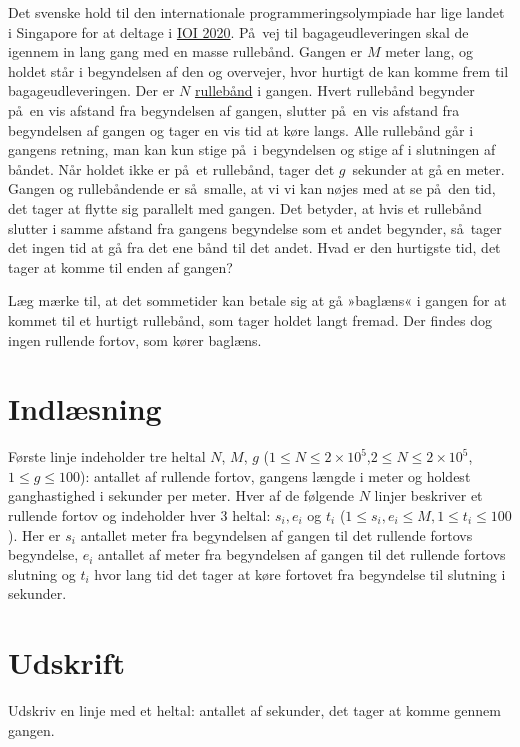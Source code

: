 
Det svenske hold til den internationale programmeringsolympiade har lige landet i Singapore for at deltage i
 \href{https://ioi2020.sg/}{IOI 2020}.
På vej til bagageudleveringen skal de igennem in lang gang med en masse rullebånd.
Gangen er $M$ meter lang, og holdet står i begyndelsen af den og overvejer, hvor hurtigt de kan komme frem til bagageudleveringen. 
Der er $N$ \href{https://sv.wikipedia.org/wiki/Rullande_trottoar}{rullebånd} i gangen.
Hvert rullebånd begynder på en vis afstand fra begyndelsen af gangen, slutter på en vis afstand fra begyndelsen af gangen og tager en vis tid at køre langs.
Alle rullebånd går i gangens retning, man kan kun stige på i begyndelsen og stige af i slutningen af båndet.
Når holdet ikke er på et rullebånd, tager det $g$~sekunder at gå en meter.
Gangen og rullebåndende er så smalle, at vi vi kan nøjes med at se på den tid, det tager at flytte sig parallelt med gangen.
Det betyder, at hvis et rullebånd slutter i samme afstand fra gangens begyndelse som et andet begynder, så tager det ingen tid at gå fra det ene bånd til det andet.
Hvad er den hurtigste tid, det tager at komme til enden af gangen?

Læg mærke til, at det sommetider kan betale sig at gå »baglæns« i gangen for at kommet til et hurtigt rullebånd, som tager holdet langt fremad.
Der findes dog ingen rullende fortov, som kører baglæns.

\section*{Indlæsning}
Første linje indeholder tre heltal $N$, $M$, $g$ ($1 \le N \le 2 \times 10^5$,$2 \le N \le 2 \times 10^5$, $1 \le g \le 100$):
antallet af rullende fortov, gangens længde i meter og holdest ganghastighed i sekunder per meter.
Hver af de følgende $N$ linjer beskriver et rullende fortov og indeholder hver 3 heltal: $s_i, e_i$ og $t_i$
($1\leq s_i,e_i\leq M,1\leq t_i\leq100$).
Her er $s_i$  antallet meter fra begyndelsen af gangen til det rullende fortovs begyndelse, $e_i$ antallet af meter fra begyndelsen af gangen til det rullende fortovs slutning og $t_i$ hvor lang tid det tager at køre fortovet fra begyndelse til slutning i sekunder.

\section*{Udskrift}
Udskriv en linje med et heltal: antallet af sekunder, det tager at komme gennem gangen.

